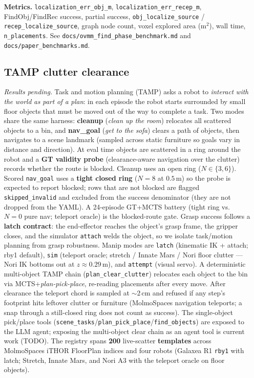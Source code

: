 \textbf{Metrics.}
\texttt{localization\_err\_obj\_m}, \texttt{localization\_err\_recep\_m}, FindObj/FindRec success, partial success, \texttt{obj\_localize\_source} / \texttt{recep\_localize\_source}, graph node count, voxel explored area (m$^2$), wall time, \texttt{n\_placements}.
See \texttt{docs/ovmm\_find\_phase\_benchmark.md} and \texttt{docs/paper\_benchmarks.md}.

\subsection{TAMP clutter clearance}
\label{sec:tamp_clutter}

\textit{Results pending.}
Task and motion planning (TAMP) asks a robot to \emph{interact with the world as part of
a plan}: in each episode the robot starts surrounded by small floor objects that must be
moved out of the way to complete a task. Two modes share the same harness:
\textbf{cleanup} (\emph{clean up the room}) relocates all scattered objects to a bin, and
\textbf{nav\_goal} (\emph{get to the sofa}) clears a path of objects, then navigates to a
scene landmark (sampled across static furniture so goals vary in distance and direction).
At eval time objects are scattered in a ring around the robot and a \textbf{GT validity
probe} (clearance-aware navigation over the clutter) records whether the route is
blocked. Cleanup uses an open ring ($N\in\{3,6\}$). Scored \texttt{nav\_goal} uses a
\textbf{tight closed ring} ($N{=}8$ at $0.5$\,m) so the probe is expected to report
blocked; rows that are not blocked are flagged \texttt{skipped\_invalid} and excluded
from the success denominator (they are not dropped from the YAML). A 24-episode
GT+MCTS battery (tight ring vs.\ $N{=}0$ pure nav; teleport oracle) is the blocked-route
gate. Grasp success follows a \textbf{latch contract}: the end-effector reaches
the object's grasp frame, the gripper closes, and the simulator \texttt{attach} welds the
object, so we isolate task/motion planning from grasp robustness. Manip modes are
\texttt{latch} (kinematic IK + attach; rby1 default), \texttt{sim} (teleport oracle;
stretch / Innate Mars / Nori floor clutter --- Nori IK bottoms out at $z\approx 0.29$\,m),
and \texttt{attempt} (visual servo). A deterministic multi-object TAMP chain
(\texttt{plan\_clear\_clutter}) relocates each object to the bin via
MCTS+\emph{plan-pick-place}, re-reading placements after every move.
After clearance the teleport chord is sampled at $\sim$2\,cm and refused if
any step's footprint hits leftover clutter or furniture (MolmoSpaces navigation
teleports; a snap through a still-closed ring does not count as success). The single-object
pick/place tools (\texttt{scene\_tasks}/\texttt{plan\_pick\_place}/\texttt{find\_objects})
are exposed to the LLM agent; exposing the multi-object clear chain as an agent tool is
current work (TODO).
The registry spans \textbf{200} live-scatter \textbf{templates} across MolmoSpaces iTHOR
FloorPlan indices and four robots (Galaxea R1 \texttt{rby1} with latch; Stretch, Innate
Mars, and Nori A3 with the teleport oracle on floor objects).


